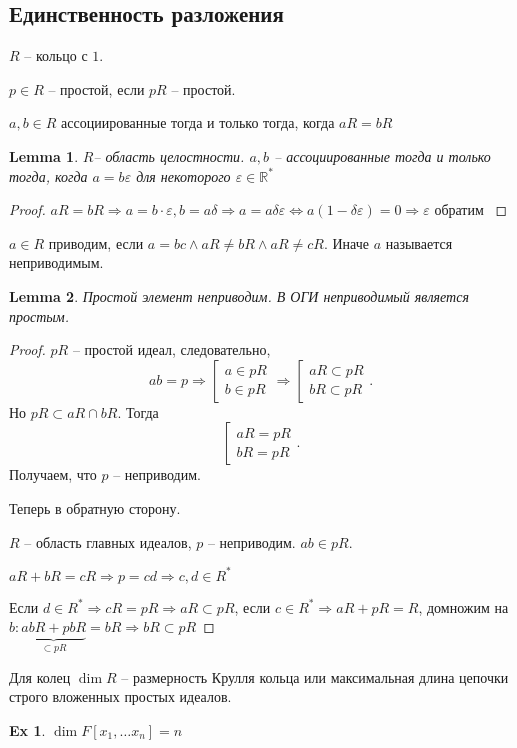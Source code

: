 \documentclass[11pt]{book}
\newcommand{\R}{\mathbb{R}}
\theoremstyle{definition}
\theoremstyle{plain}
\theoremstyle{plain}
\newtheorem*{lm}{Lemma}
\theoremstyle{definition}
\newtheorem*{ex}{Ex}
\theoremstyle{remark}
\begin{document}
\subsection{Единственность разложения}
$ R$ -- кольцо с $ 1$.
 \begin{defn}
    $ p \in R$ -- простой, если $ pR$ -- простой.
\end{defn}
\begin{defn}
    $ a, b \in  R$ ассоциированные тогда и только тогда, когда $ aR = bR$
\end{defn}
\begin{lm}
    $ R $-- область целостности. $ a, b$ -- ассоциированные тогда и только тогда, когда  $ a = b \varepsilon $ для некоторого $ \varepsilon \in \R^{*}$
\end{lm}
\begin{proof}
    $ aR = bR \Rightarrow a = b \cdot \varepsilon , b = a \delta  \Rightarrow a = a \delta  \varepsilon  \Leftrightarrow a (1- \delta  \varepsilon ) = 0 \Rightarrow \varepsilon  \text{ обратим }$
\end{proof}
\begin{defn}
    $ a \in R$ приводим, если $ a = bc \wedge aR \ne bR \wedge  aR \ne cR$. Иначе $ a$ называется неприводимым.
\end{defn}
\begin{lm}
    Простой элемент неприводим. В ОГИ неприводимый является простым.
\end{lm}
\begin{proof}
    $ pR$ -- простой идеал, следовательно,
    \[
    ab = p \Rightarrow 
    \left [
    \begin{array}{l}
	a \in  pR \\
	b \in  pR
        
    \end{array}
    \right .
    \Rightarrow 
    \left[
    \begin{array}{l}
        aR \subset pR \\
	bR \subset  pR
    \end{array}
    \right .
    .\] 
    Но $ pR \subset  aR \cap bR$. Тогда 
    \[
	\left[
	\begin{array}{l}
        aR = pR \\
	bR = pR
    \end{array}
    \right.
    .\] 
    Получаем, что $ p$ -- неприводим.

    Теперь в обратную сторону.

    $ R$ -- область главных идеалов, $ p $ -- неприводим. $ ab \in  pR$.

    $ aR + bR = cR \Longrightarrow p = cd \Longrightarrow c, d \in  R^{*}$

    Если $ d \in  R^{*} \Longrightarrow cR = pR \Longrightarrow aR \subset pR$, если $ c \in  R^{*} \Longrightarrow  aR +pR = R$, домножим на $ b: \underbrace{abR + pbR }_ { \subset   pR}= bR \Longrightarrow  bR \subset pR$
\end{proof}
\begin{defn}
    Для колец $ \dim R$ --  размерность Крулля кольца или максимальная длина цепочки строго вложенных простых идеалов.
\end{defn}
\begin{ex}
    $ \dim F[x_1, \ldots x_n] = n$
\end{ex}
\end{document}
